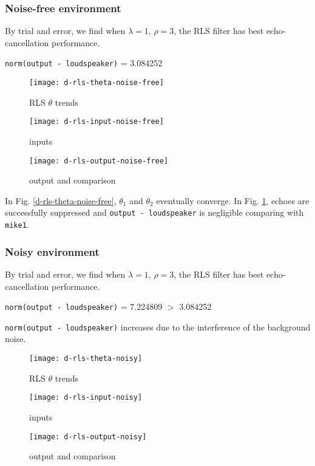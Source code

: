 \documentclass{article}
\begin{document}
\subsubsection*{Noise-free environment}

By trial and error, we find when $\lambda = 1$, $\rho = 3$, the RLS filter has best echo-cancellation performance.
\begin{center}
\texttt{norm(output - loudspeaker)} = 3.084252
\end{center}

\begin{figure}[H]
\begin{minipage}[t]{0.33\linewidth}
\centering
\texttt{[image: d-rls-theta-noise-free]}
\caption{RLS $\theta$ trends}
\label{d-rls-theta-noise-free}
\end{minipage}
\begin{minipage}[t]{0.33\linewidth}
\centering
\texttt{[image: d-rls-input-noise-free]}
\caption{inputs}
\end{minipage}
\begin{minipage}[t]{0.33\linewidth}
\centering
\texttt{[image: d-rls-output-noise-free]}
\caption{output and comparison}
\label{d-rls-output-noise-free}
\end{minipage}
\end{figure}

In Fig. \ref{d-rls-theta-noise-free}, $\theta_1$ and $\theta_2$ eventually converge. In Fig. \ref{d-rls-output-noise-free}, echoes are successfully suppressed and \texttt{output - loudspeaker} is negligible comparing with \texttt{mike1}.


\subsubsection*{Noisy environment}

By trial and error, we find when $\lambda = 1$, $\rho = 3$, the RLS filter has best echo-cancellation performance.
\begin{center}
\texttt{norm(output - loudspeaker)} = 7.224809 $>$ 3.084252
\end{center}
\texttt{norm(output - loudspeaker)} increases due to the interference of the background noise.

\begin{figure}[H]
\begin{minipage}[t]{0.33\linewidth}
\centering
\texttt{[image: d-rls-theta-noisy]}
\caption{RLS $\theta$ trends}
\label{d-rls-theta-noisy}
\end{minipage}
\begin{minipage}[t]{0.33\linewidth}
\centering
\texttt{[image: d-rls-input-noisy]}
\caption{inputs}
\end{minipage}
\begin{minipage}[t]{0.33\linewidth}
\centering
\texttt{[image: d-rls-output-noisy]}
\caption{output and comparison}
\label{d-rls-output-noisy}
\end{minipage}
\end{figure}
\end{document}
